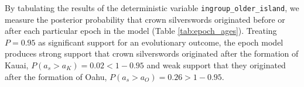By tabulating the results of the deterministic variable {\tt ingroup\_older\_island}, we measure the posterior probability that crown silverswords originated before or after each particular epoch in the model (Table \ref{tab:epoch_ages}).
Treating $P=0.95$ as significant support for an evolutionary outcome, the epoch model produces strong support that crown silverswords originated after the formation of Kauai, $P(a_s > a_K) = 0.02 < 1-0.95$ and weak support that they originated after the formation of Oahu, $P(a_s > a_O) = 0.26 > 1-0.95$.


\newpage
